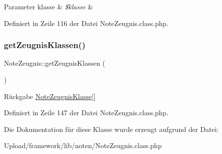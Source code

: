 \begin{DoxyParams}[1]{Parameter}
klasse & {\em \$klasse} & \\
\hline
\end{DoxyParams}


Definiert in Zeile 116 der Datei Note\+Zeugnis.\+class.\+php.

\mbox{\label{class_note_zeugnis_a6be0a92e83ebe2d7a8ad0a64c81ce001}} 
\subsubsection{\texorpdfstring{get\+Zeugnis\+Klassen()}{getZeugnisKlassen()}}
{\footnotesize\ttfamily Note\+Zeugnis\+::get\+Zeugnis\+Klassen (\begin{DoxyParamCaption}{ }\end{DoxyParamCaption})}

\begin{DoxyReturn}{Rückgabe}
\mbox{\hyperlink{class_note_zeugnis_klasse}{Note\+Zeugnis\+Klasse}}\mbox{[}\mbox{]} 
\end{DoxyReturn}


Definiert in Zeile 147 der Datei Note\+Zeugnis.\+class.\+php.



Die Dokumentation für diese Klasse wurde erzeugt aufgrund der Datei\+:\begin{DoxyCompactItemize}
\item 
Upload/framework/lib/noten/Note\+Zeugnis.\+class.\+php\end{DoxyCompactItemize}
